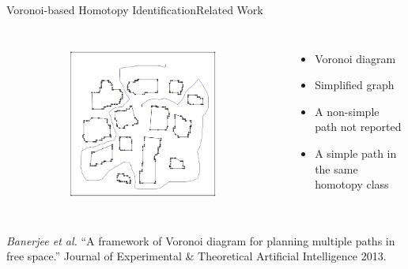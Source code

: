 \begin{frame}{Voronoi-based Homotopy Identification}{Related Work}
\begin{columns}
\begin{figure}
\begin{subfigure}
\end{subfigure}
\begin{subfigure}
	\centering
	\includegraphics[width=.45\linewidth]{figure/voronoi_homotopy4}
\end{subfigure}
\end{figure}

\begin{itemize}
\item Voronoi diagram
\item Simplified graph
\item A non-simple path not reported 
\item A simple path in the same homotopy class
\end{itemize}

\end{columns}

\tiny{ {\it Banerjee et al.} ``A framework of Voronoi diagram for planning multiple paths in free space.'' Journal of Experimental \& Theoretical Artificial Intelligence 2013.}

\end{frame}

